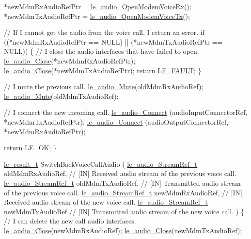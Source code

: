 \begin{DoxyCode}
    *newMdmRxAudioRefPtr = \hyperlink{le__audio__interface_8h_ae3ed568ba4d2763ea77e17e77b20ff02}{le\_audio\_OpenModemVoiceRx}();
    *newMdmTxAudioRefPtr = \hyperlink{le__audio__interface_8h_ad745f008bb04873c817da7af3daf783d}{le\_audio\_OpenModemVoiceTx}();

    \textcolor{comment}{// If I cannot get the audio from the voice call, I return an error.}
    \textcolor{keywordflow}{if} ((*newMdmRxAudioRefPtr == NULL) || (*newMdmTxAudioRefPtr == NULL))
    \{
        \textcolor{comment}{// I close the audio interfaces that have failed to open.}
        \hyperlink{le__audio__interface_8h_abafeb411da7b1a14b2d5777fc1d3e394}{le\_audio\_Close}(*newMdmRxAudioRefPtr);
        \hyperlink{le__audio__interface_8h_abafeb411da7b1a14b2d5777fc1d3e394}{le\_audio\_Close}(*newMdmTxAudioRefPtr);
        \textcolor{keywordflow}{return} \hyperlink{le__basics_8h_a1cca095ed6ebab24b57a636382a6c86cac409634423b6b1ef09643529f6224798}{LE\_FAULT};
    \}

    \textcolor{comment}{// I mute the previous call.}
    \hyperlink{le__audio__interface_8h_a147e97c49dbc003f63df78f97d5fca32}{le\_audio\_Mute}(oldMdmRxAudioRef);
    \hyperlink{le__audio__interface_8h_a147e97c49dbc003f63df78f97d5fca32}{le\_audio\_Mute}(oldMdmTxAudioRef);

    \textcolor{comment}{// I connect the new incoming call.}
    \hyperlink{le__audio__interface_8h_a338df65b2fb1ae0140d86880adbcf0de}{le\_audio\_Connect} (audioInputConnectorRef, *newMdmTxAudioRefPtr);
    \hyperlink{le__audio__interface_8h_a338df65b2fb1ae0140d86880adbcf0de}{le\_audio\_Connect} (audioOutputConnectorRef, *newMdmRxAudioRefPtr);

    \textcolor{keywordflow}{return} \hyperlink{le__basics_8h_a1cca095ed6ebab24b57a636382a6c86ca5066a4bcec691c6b67843b8f79656422}{LE\_OK};
\}


\hyperlink{le__basics_8h_a1cca095ed6ebab24b57a636382a6c86c}{le\_result\_t} SwitchBackVoiceCallAudio
(
    \hyperlink{le__audio__interface_8h_a9a46ff5a5afa61f1bc76120ab9e4da0a}{le\_audio\_StreamRef\_t}  oldMdmRxAudioRef, \textcolor{comment}{// [IN] Received audio stream of the
       previous voice call.}
    \hyperlink{le__audio__interface_8h_a9a46ff5a5afa61f1bc76120ab9e4da0a}{le\_audio\_StreamRef\_t}  oldMdmTxAudioRef, \textcolor{comment}{// [IN] Transmitted audio stream of the
       previous voice call.}
    \hyperlink{le__audio__interface_8h_a9a46ff5a5afa61f1bc76120ab9e4da0a}{le\_audio\_StreamRef\_t}  newMdmRxAudioRef, \textcolor{comment}{// [IN] Received audio stream of the new
       voice call.}
    \hyperlink{le__audio__interface_8h_a9a46ff5a5afa61f1bc76120ab9e4da0a}{le\_audio\_StreamRef\_t}  newMdmTxAudioRef  \textcolor{comment}{// [IN] Transmitted audio stream  of the
       new voice call.}
)
\{
    \textcolor{comment}{// I can delete the new call audio interfaces.}
    \hyperlink{le__audio__interface_8h_abafeb411da7b1a14b2d5777fc1d3e394}{le\_audio\_Close}(newMdmRxAudioRef);
    \hyperlink{le__audio__interface_8h_abafeb411da7b1a14b2d5777fc1d3e394}{le\_audio\_Close}(newMdmTxAudioRef);


\end{DoxyCode}

